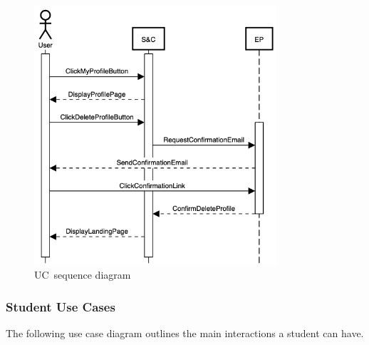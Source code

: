 \begin{figure}[h]
    \centering
    \includegraphics[width=9cm]{images/sequence-diagrams/user-deletes-profile.png}
    \caption{UC\theuc\ sequence diagram}
\end{figure}


\clearpage
\subsubsection{Student Use Cases}
The following use case diagram outlines the main interactions a student can have.

